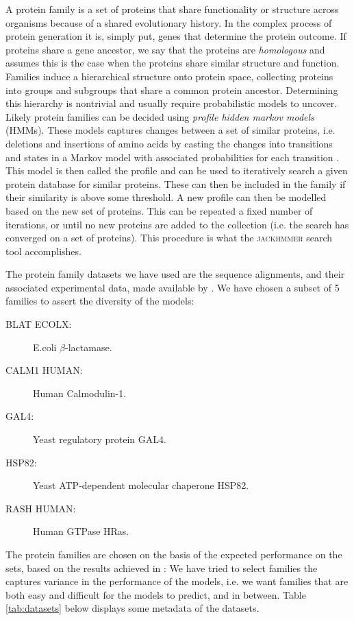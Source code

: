 A protein family is a set of proteins that share functionality or structure across organisms because of a shared evolutionary history. In the complex process of protein generation it is, simply put, genes that determine the protein outcome. If proteins share a gene ancestor, we say that the proteins are \textit{homologous} and assumes this is the case when the proteins share similar structure and function. Families induce a hierarchical structure onto protein space, collecting proteins into groups and subgroups that share a common protein ancestor. Determining this hierarchy is nontrivial and usually require probabilistic models to uncover. Likely protein families can be decided using \textit{profile hidden markov models} (HMMs). These models captures changes between a set of similar proteins, i.e. deletions and insertions of amino acids by casting the changes into transitions and states in a Markov model with associated probabilities for each transition \cite{eddy1998profile}. This model is then called the profile and can be used to iteratively search a given protein database for similar proteins. These can then be included in the family if their similarity is above some threshold. A new profile can then be modelled based on the new set of proteins. This can be repeated a fixed number of iterations, or until no new proteins are added to the collection (i.e. the search has converged on a set of proteins). This procedure is what the \textsc{jackhmmer} search tool accomplishes.

The protein family datasets we have used are the sequence alignments, and their associated experimental data, made available by \textcite{riesselman2018deep}. We have chosen a subset of 5 families to assert the diversity of the models: 
\begin{description}
    \item[BLAT ECOLX:] E.coli $\beta$-lactamase.
    \item[CALM1 HUMAN:] Human Calmodulin-1.
    \item[GAL4:] Yeast regulatory protein GAL4.
    \item[HSP82:] Yeast ATP-dependent molecular chaperone HSP82.
    \item[RASH HUMAN:] Human GTPase HRas.
\end{description}
The protein families are chosen on the basis of the expected performance on the sets, based on the results achieved in \textcite{riesselman2018deep}: We have tried to select families the captures variance in the performance of the models, i.e. we want families that are both easy and difficult for the models to predict, and in between. Table \ref{tab:datasets} below displays some metadata of the datasets.

